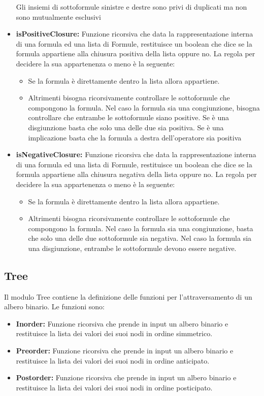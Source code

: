 \documentclass[\main/tesi.tex]{subfiles}
\begin{document}
\begin{itemize}
          Gli insiemi di sottoformule sinistre e destre sono privi di duplicati ma non sono mutualmente esclusivi
    \item \textbf{isPositiveClosure:} Funzione ricorsiva che data la rappresentazione interna di una formula ed una lista di Formule, restituisce un boolean che dice se la formula appartiene alla chiusura positiva della lista oppure no. La regola per decidere la sua appartenenza o meno è la seguente:
          \begin{itemize}
              \item Se la formula è direttamente dentro la lista allora appartiene.
              \item Altrimenti bisogna ricorsivamente controllare le sottoformule che compongono la formula. Nel caso la formula sia una congiunzione, bisogna controllare che entrambe le sottoformule siano positive. Se è una disgiunzione basta che solo una delle due sia positiva. Se è una implicazione basta che la formula a destra dell'operatore sia positiva
          \end{itemize}
    \item \textbf{isNegativeClosure:} Funzione ricorsiva che data la rappresentazione interna di una formula ed una lista di Formule, restituisce un boolean che dice se la formula appartiene alla chiusura negativa della lista oppure no. La regola per decidere la sua appartenenza o meno è la seguente:
          \begin{itemize}
              \item Se la formula è direttamente dentro la lista allora appartiene.
              \item Altrimenti bisogna ricorsivamente controllare le sottoformule che compongono la formula. Nel caso la formula sia una congiunzione, basta che solo una delle due sottoformule sia negativa. Nel caso la formula sia una disgiunzione, entrambe le sottoformule devono essere negative.
          \end{itemize}
\end{itemize}

\subsection{Tree}
Il modulo Tree contiene la definizione delle funzioni per l'attraversamento di un albero binario. Le funzioni sono:
\begin{itemize}
    \item \textbf{Inorder:} Funzione ricorsiva che prende in input un albero binario e restituisce la lista dei valori dei suoi nodi in ordine simmetrico.
    \item \textbf{Preorder:} Funzione ricorsiva che prende in input un albero binario e restituisce la lista dei valori dei suoi nodi in ordine anticipato.
    \item \textbf{Postorder:} Funzione ricorsiva che prende in input un albero binario e restituisce la lista dei valori dei suoi nodi in ordine posticipato.
\end{itemize}
\end{document}
